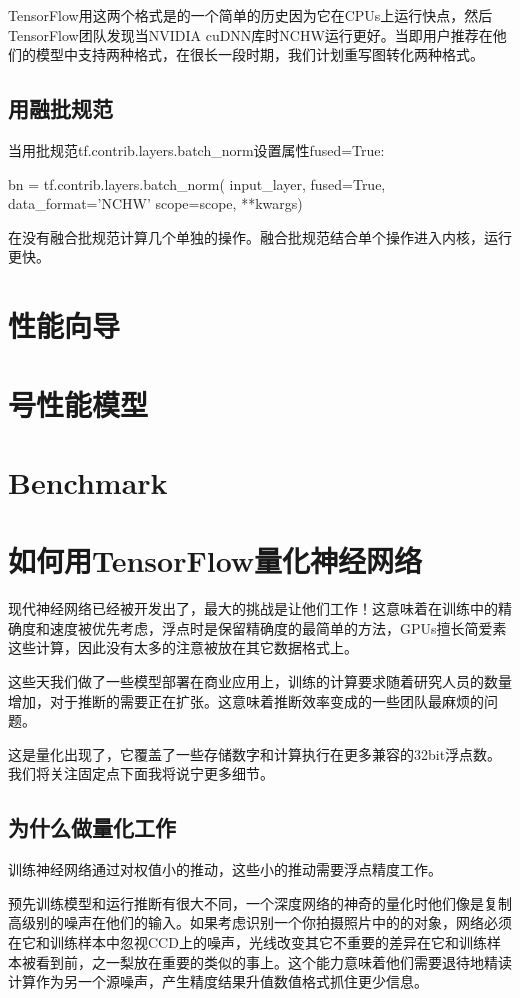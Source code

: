 TensorFlow用这两个格式是的一个简单的历史因为它在CPUs上运行快点，然后TensorFlow团队发现当NVIDIA cuDNN库时NCHW运行更好。当即用户推荐在他们的模型中支持两种格式，在很长一段时期，我们计划重写图转化两种格式。
\subsection{用融批规范}
当用批规范tf.contrib.layers.batch\_norm设置属性fused=True:
\begin{python}
bn = tf.contrib.layers.batch_norm(
          input_layer, fused=True, data_format='NCHW'
          scope=scope, **kwargs)
\end{python}
在没有融合批规范计算几个单独的操作。融合批规范结合单个操作进入内核，运行更快。
\section{性能向导}
\section{号性能模型}
\section{Benchmark}

\section{如何用TensorFlow量化神经网络}
现代神经网络已经被开发出了，最大的挑战是让他们工作！这意味着在训练中的精确度和速度被优先考虑，浮点时是保留精确度的最简单的方法，GPUs擅长简爱素这些计算，因此没有太多的注意被放在其它数据格式上。

这些天我们做了一些模型部署在商业应用上，训练的计算要求随着研究人员的数量增加，对于推断的需要正在扩张。这意味着推断效率变成的一些团队最麻烦的问题。

这是量化出现了，它覆盖了一些存储数字和计算执行在更多兼容的32bit浮点数。我们将关注固定点下面我将说宁更多细节。
\subsection{为什么做量化工作}
训练神经网络通过对权值小的推动，这些小的推动需要浮点精度工作。

预先训练模型和运行推断有很大不同，一个深度网络的神奇的量化时他们像是复制高级别的噪声在他们的输入。如果考虑识别一个你拍摄照片中的的对象，网络必须在它和训练样本中忽视CCD上的噪声，光线改变其它不重要的差异在它和训练样本被看到前，之一梨放在重要的类似的事上。这个能力意味着他们需要退待地精读计算作为另一个源噪声，产生精度结果升值数值格式抓住更少信息。
